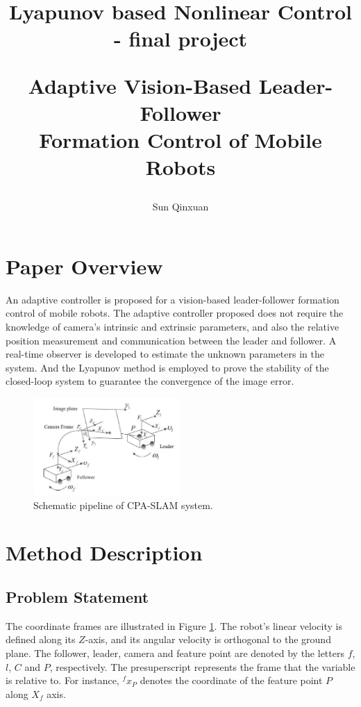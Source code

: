 \documentclass[12pt,a4paper]{article}
\title{Lyapunov based Nonlinear Control - final project \\ [2ex] \begin{large} Adaptive Vision-Based Leader-Follower \\ Formation Control of Mobile Robots \end{large} }
\author{Sun Qinxuan}
\begin{document}
\maketitle

\section{Paper Overview}

\indent An adaptive controller is proposed for a vision-based leader-follower formation control of mobile robots. The adaptive controller proposed does not require the knowledge of camera's intrinsic and extrinsic parameters, and also the relative position measurement and communication between the leader and follower. A real-time observer is developed to estimate the unknown parameters in the system. And the Lyapunov method is employed to prove the stability of the closed-loop system to guarantee the convergence of the image error.

\begin{figure}
  \centering
  \includegraphics[width=0.5\textwidth]{figs/model.jpg}%
  \caption{Schematic pipeline of CPA-SLAM system.}
  \label{model}
\end{figure}

\section{Method Description}


\subsection{Problem Statement}

\indent The coordinate frames are illustrated in Figure \ref{model}. The robot's linear velocity is defined along its $Z$-axis, and its angular velocity is orthogonal to the ground plane. The follower, leader, camera and feature point are denoted by the letters $f$, $l$, $C$ and $P$, respectively. The presuperscript represents the frame that the variable is relative to. For instance, ${}^fx_P$ denotes the coordinate of the feature point $P$ along $X_f$ axis.
\end{document}
